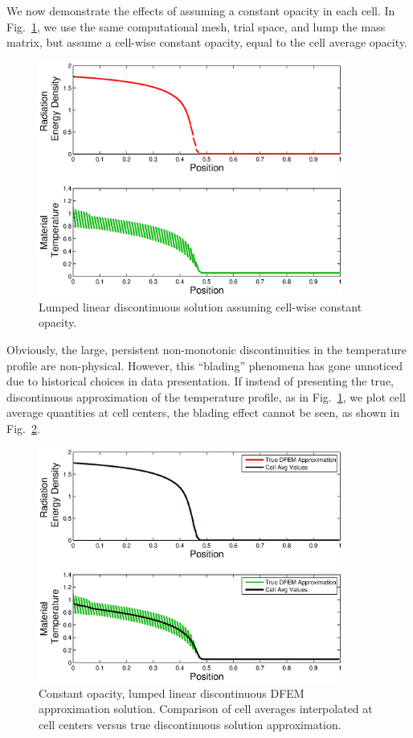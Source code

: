 \documentclass[final,3p,times]{elsarticle}
\newcommand{\fig}[1]{Fig.~\ref{#1}}                      %
\begin{document}
We now demonstrate the effects of assuming a constant opacity in each cell.  
In \fig{fig:blades}, we use the same computational mesh, trial space, and lump the mass matrix, but assume a cell-wise constant opacity, equal to the cell average opacity.
\begin{figure}[!hbp]
\begin{center}
\includegraphics[width=10cm]{Proposal_blades.eps}
\end{center}
\caption{Lumped linear discontinuous solution assuming cell-wise constant opacity.}
\label{fig:blades}
\end{figure}
Obviously, the large, persistent non-monotonic discontinuities in the temperature profile are non-physical.  
However, this ``blading'' phenomena has gone unnoticed due to historical choices in data presentation.
If instead of presenting the true, discontinuous approximation of the temperature profile, as in \fig{fig:blades}, we plot cell average quantities at cell centers, the blading effect cannot be seen, as shown in \fig{fig:plot}.
\begin{figure}[!htp]
\begin{center}
\includegraphics[width=10cm]{Proposal_plot.eps}
\end{center}
\caption{Constant opacity, lumped linear discontinuous DFEM approximation solution.  Comparison of cell averages interpolated at cell centers versus true discontinuous solution approximation.}
\label{fig:plot}
\end{figure}
\end{document}
